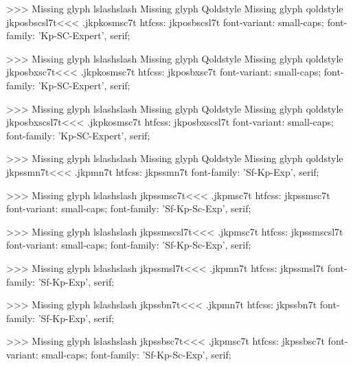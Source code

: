 >>>
Missing glyph	lslashslash
Missing glyph	Qoldstyle
Missing glyph	qoldstyle
\<jkposbscsl7t\><<<
.jkpkosmsc7t
htfcss:  jkposbscsl7t  font-variant: small-caps; font-family: 'Kp-SC-Expert', serif;

>>>
Missing glyph	lslashslash
Missing glyph	Qoldstyle
Missing glyph	qoldstyle
\<jkposbxsc7t\><<<
.jkpkosmsc7t
htfcss:  jkposbxsc7t  font-variant: small-caps; font-family: 'Kp-SC-Expert', serif;

>>>
Missing glyph	lslashslash
Missing glyph	Qoldstyle
Missing glyph	qoldstyle
\<jkposbxscsl7t\><<<
.jkpkosmsc7t
htfcss:  jkposbxscsl7t  font-variant: small-caps; font-family: 'Kp-SC-Expert', serif;

>>>
Missing glyph	lslashslash
Missing glyph	Qoldstyle
Missing glyph	qoldstyle
\<jkpssmn7t\><<<
.jkpmn7t
htfcss:  jkpssmn7t  font-family: 'Sf-Kp-Exp', serif;

>>>
Missing glyph	lslashslash
\<jkpssmsc7t\><<<
.jkpmsc7t
htfcss:  jkpssmsc7t  font-variant: small-caps; font-family: 'Sf-Kp-Sc-Exp', serif;

>>>
Missing glyph	lslashslash
\<jkpssmscsl7t\><<<
.jkpmsc7t
htfcss:  jkpssmscsl7t  font-variant: small-caps; font-family: 'Sf-Kp-Sc-Exp', serif;

>>>
Missing glyph	lslashslash
\<jkpssmsl7t\><<<
.jkpmn7t
htfcss:  jkpssmsl7t  font-family: 'Sf-Kp-Exp', serif;

>>>
Missing glyph	lslashslash
\<jkpssbn7t\><<<
.jkpmn7t
htfcss:  jkpssbn7t  font-family: 'Sf-Kp-Exp', serif;

>>>
Missing glyph	lslashslash
\<jkpssbsc7t\><<<
.jkpmsc7t
htfcss:  jkpssbsc7t  font-variant: small-caps; font-family: 'Sf-Kp-Sc-Exp', serif;

